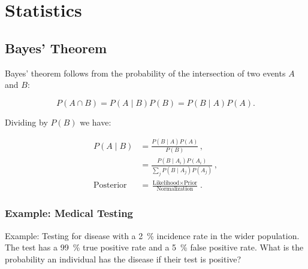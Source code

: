 \chapter{Statistics}
\label{chap:stats}

\section{Bayes' Theorem}
\label{stats:Bayes}

Bayes' theorem follows from the probability of the intersection of two events $A$ and $B$:

\begin{equation}\label{eq:stats:intersection}
P\left(A \cap B\right) = P\left(A \mid B\right) P\left(B\right) = P\left(B \mid A\right) P\left(A\right).
\end{equation}

\noindent Dividing by $P\left(B\right)$ we have:

\begin{equation}\label{eq:stats:Bayes}
\begin{split}
P\left(A \mid B\right) &= \frac{P\left(B \mid A\right) P\left(A\right)}{P\left(B\right)}\,, \\
&= \frac{P\left(B \mid A_{i}\right) P\left(A_{i}\right)}{\sum_{j} P\left(B \mid A_{j}\right)P\left(A_{j}\right)}\,, \\
\text{Posterior} &= \frac{\text{Likelihood} \times \text{Prior}}{\text{Normalization}}\,.
\end{split}
\end{equation}

\subsection{Example: Medical Testing}
\label{stats:Bayes:medical_test}

Example: Testing for disease with a \SI{2}{\percent} incidence rate in the wider population.
The test has a \SI{99}{\percent} true positive rate and a \SI{5}{\percent} false positive rate.
What is the probability an individual has the disease if their test is positive?

